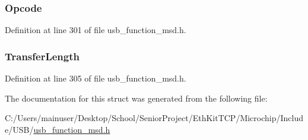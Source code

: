 \subsubsection[{Opcode}]{ Opcode}\label{struct_read_write_c_b_a3ac7536b907732d60214ae553910eed9}


Definition at line 301 of file usb\+\_\+function\+\_\+msd.\+h.

\hypertarget{struct_read_write_c_b_abd21ba8461adac4d4a61c759664044bd}{}
\subsubsection[{Transfer\+Length}]{ Transfer\+Length}\label{struct_read_write_c_b_abd21ba8461adac4d4a61c759664044bd}


Definition at line 305 of file usb\+\_\+function\+\_\+msd.\+h.



The documentation for this struct was generated from the following file\+:\begin{DoxyCompactItemize}
\item 
C\+:/\+Users/mainuser/\+Desktop/\+School/\+Senior\+Project/\+Eth\+Kit\+T\+C\+P/\+Microchip/\+Include/\+U\+S\+B/\hyperlink{usb__function__msd_8h}{usb\+\_\+function\+\_\+msd.\+h}\end{DoxyCompactItemize}
